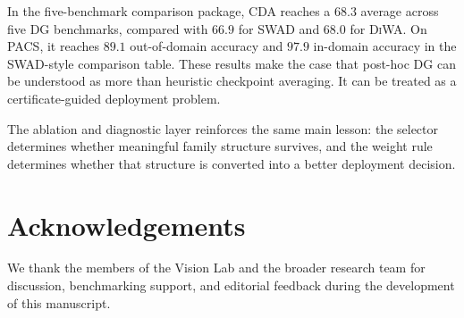 \documentclass{article}
\newif\ifsubmissionmode
\newcommand{\placeholderguard}[1]{%
  \ifsubmissionmode
    \PackageError{cda_final_v2}{Provisional red content remains in submission mode}{Remove all provisional red content before building in submission mode.}%
  \else
    {\color{red!70!black}#1}%
  \fi
}
\newcommand{\prov}[1]{\placeholderguard{#1}}
\newcommand{\data}[1]{\textsc{#1}}
\theoremstyle{definition}
\newcommand{\cda}{\textup{\textsc{CDA}}}
\newcommand{\swad}{\textup{\textsc{SWAD}}}
\newcommand{\diwa}{\textup{\textsc{DiWA}}}
\begin{document}
In the five-benchmark comparison package, \cda{} reaches a \(68.3\) average across five DG benchmarks, compared with \(66.9\) for \swad{} and \(68.0\) for \diwa{}. On \data{PACS}, it reaches \(89.1\) out-of-domain accuracy and \(97.9\) in-domain accuracy in the SWAD-style comparison table. These results make the case that post-hoc DG can be understood as more than heuristic checkpoint averaging. It can be treated as a certificate-guided deployment problem.

\prov{The ablation and diagnostic layer reinforces the same main lesson: the selector determines whether meaningful family structure survives, and the weight rule determines whether that structure is converted into a better deployment decision.}

\section*{Acknowledgements}

We thank the members of the Vision Lab and the broader research team for discussion, benchmarking support, and editorial feedback during the development of this manuscript.




\appendix


\end{document}
